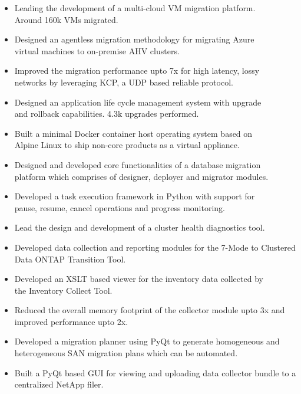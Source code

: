 \documentclass[10pt,a4paper,ragged2e,withhyper]{altacv}
\begin{document}
\begin{paracol}{2}
	
	
	\begin{itemize}
		\item Leading the development of a multi-cloud VM migration platform. \\Around 160k VMs migrated.
		\item Designed an agentless migration methodology for migrating Azure\\ virtual machines to on-premise AHV clusters.
		\item Improved the migration performance upto 7x for high latency, lossy\\ networks by leveraging KCP, a UDP based reliable protocol.
		\item Designed an application life cycle management system with upgrade\\ and rollback capabilities. 4.3k upgrades performed.
		\item Built a minimal Docker container host operating system based on\\ Alpine Linux to ship non-core products as a virtual appliance.
		\item Designed and developed core functionalities of a database migration\\ platform which comprises of designer, deployer and migrator modules.
		\item Developed a task execution framework in Python with support for\\  pause, resume, cancel operations and progress monitoring.
		\item Lead the design and development of a cluster health diagnostics tool.
	\end{itemize}
	
	\divider
	
	\begin{itemize}
		\item Developed data collection and reporting modules for the 7-Mode to Clustered Data ONTAP Transition Tool.
		\item Developed an XSLT based viewer for the inventory data collected by\\ the Inventory Collect Tool.
		\item Reduced the overall memory footprint of the collector module upto 3x and improved performance upto 2x.
		\item Developed a migration planner using PyQt to generate homogeneous and heterogeneous SAN migration plans which can be automated.
		\item Built a PyQt based GUI for viewing and uploading data collector bundle to a centralized NetApp filer.
	\end{itemize}
	

\end{paracol}
\end{document}
